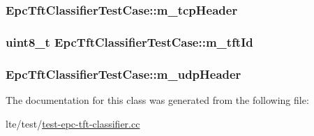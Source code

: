 \subsubsection[{\texorpdfstring{m\+\_\+tcp\+Header}{m_tcpHeader}}]{ Epc\+Tft\+Classifier\+Test\+Case\+::m\+\_\+tcp\+Header\hspace{0.3cm}{\ttfamily [private]}}\hypertarget{classEpcTftClassifierTestCase_a0f530ea1a0c42557cefb248bfd1fe4c9}{}\label{classEpcTftClassifierTestCase_a0f530ea1a0c42557cefb248bfd1fe4c9}
\subsubsection[{\texorpdfstring{m\+\_\+tft\+Id}{m_tftId}}]{\setlength{\rightskip}{0pt plus 5cm}uint8\+\_\+t Epc\+Tft\+Classifier\+Test\+Case\+::m\+\_\+tft\+Id\hspace{0.3cm}{\ttfamily [private]}}\hypertarget{classEpcTftClassifierTestCase_add3bc04647b3ec1fdd7acf61bd8ae367}{}\label{classEpcTftClassifierTestCase_add3bc04647b3ec1fdd7acf61bd8ae367}
\subsubsection[{\texorpdfstring{m\+\_\+udp\+Header}{m_udpHeader}}]{ Epc\+Tft\+Classifier\+Test\+Case\+::m\+\_\+udp\+Header\hspace{0.3cm}{\ttfamily [private]}}\hypertarget{classEpcTftClassifierTestCase_aae9ae1b83d7fc414b91d4ed86a48b8f4}{}\label{classEpcTftClassifierTestCase_aae9ae1b83d7fc414b91d4ed86a48b8f4}


The documentation for this class was generated from the following file\+:\begin{DoxyCompactItemize}
\item 
lte/test/\hyperlink{test-epc-tft-classifier_8cc}{test-\/epc-\/tft-\/classifier.\+cc}\end{DoxyCompactItemize}
